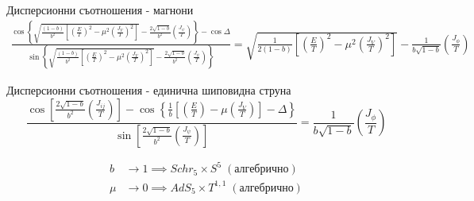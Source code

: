 \documentclass[bulg]{beamer}
\begin{document}
\begin{frame}{}
  {}
\begin{alertblock}{Дисперсионни съотношения - магнони}
  \tiny
  \vspace{-0.5cm}
  \begin{multline*}
\frac{\cos
\left\{\sqrt{\frac{(1-b)}{b^{2}}\left[\left(\frac{E}{T}\right)^{2}-\mu^{2}\left(\frac{J_{V}}{T}\right)^{2}\right]}-\frac{2
\sqrt{1-b}}{b^{2}}\left(\frac{J_{\psi}}{T}\right)\right\}-\cos \Delta}{\sin \left\{\sqrt{\frac{(1-b)}{b^{2}}\left[\left(\frac{E}{T}\right)^{2}-\mu^{2}\left(\frac{J_{V}}{T}\right)^{2}\right]}-\frac{2 \sqrt{1-b}}{b^{2}}\left(\frac{J_{\psi}}{T}\right)\right\}}= 
\sqrt{\frac{1}{2(1-b)}\left[\left(\frac{E}{T}\right)^{2}-\mu^{2}\left(\frac{J_{V}}{T}\right)^{2}\right]}-\frac{1}{b
\sqrt{1-b}}\left(\frac{J_{\phi}}{T}\right)
\label{eq:magnon}
\end{multline*}
\end{alertblock}
\vspace{0.2cm}
\begin{alertblock}{Дисперсионни съотношения - единична шиповидна струна}
\begin{equation*}
\frac{\cos \left[\frac{2 \sqrt{1-b}}{b^{2}}\left(\frac{J_{i j}}{T}\right)\right]-\cos \left\{\frac{1}{b}\left[\left(\frac{E}{T}\right)-\mu\left(\frac{J_{V}}{T}\right)\right]-\Delta\right\}}{\sin \left[\frac{2 \sqrt{1-b}}{b^{2}}\left(\frac{J_{\psi}}{T}\right)\right]}=\frac{1}{b \sqrt{1-b}}\left(\frac{J_{\phi}}{T}\right)
\end{equation*}
\end{alertblock}

\begin{minipage}[t]{0.6\textwidth}
  \vspace{-0.5cm}
  \begin{align*}
    b &\rightarrow 1 \implies Schr_5\times S^5 \;(\text{алгебрично})\\
    \mu &\rightarrow 0 \implies AdS_5\times T^{1,1} \;(\text{алгебрично})
  \end{align*}
\end{minipage}
\end{frame}
\end{document}

